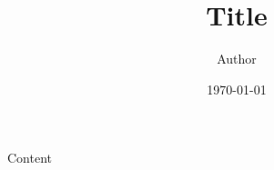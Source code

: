\documentclass[a4paper]{article}
\title{Title}
\author{Author}
\date{\today}
\begin{document}
\maketitle

Content
\end{document}
